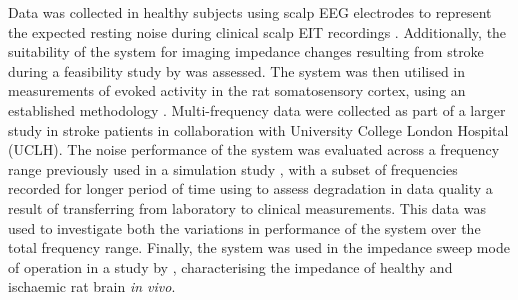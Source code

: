 Data was collected in healthy subjects using scalp EEG electrodes to represent the expected resting noise during clinical scalp EIT recordings \cite{Fabrizi_2006,fabrizi2007analysis,Romsauerova2006}. Additionally, the suitability of the system for imaging impedance changes resulting from stroke during a feasibility study by \citet{Dowrick_2016} was assessed. The system was then utilised in measurements of evoked activity in the rat somatosensory cortex, using an established methodology \cite{Oh2011,Aristovich_2016}. Multi-frequency data were collected as part of a larger study in stroke patients in collaboration with University College London Hospital (UCLH). The noise performance of the system was evaluated across a frequency range previously used in a simulation study \cite{Malone2014a}, with a subset of frequencies recorded for longer period of time using to assess degradation in data quality a result of transferring from laboratory to clinical measurements. This data was used to investigate both the variations in performance of the system over the total frequency range. Finally, the system was used in the impedance sweep mode of operation in a study by \citet{Dowrick_2015}, characterising the impedance of healthy and ischaemic rat brain \emph{in vivo}. 

